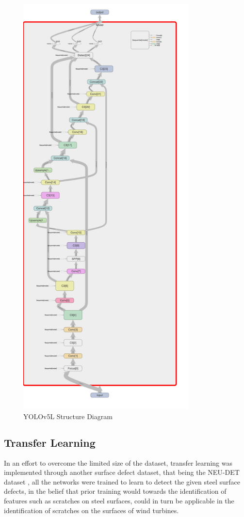 \documentclass[conference]{IEEEtran}
\begin{document}
\begin{figure}[H]
    \centering
    \includegraphics[width=9cm]{Images/YOLOV5L.png}
    \caption{YOLOv5L Structure Diagram}
    \label{fig:yol}
\end{figure}


\subsection{Transfer Learning}
In an effort to overcome the limited size of the dataset, transfer learning was implemented through another surface defect dataset, that being the NEU-DET dataset \cite{he_song_meng_yan_2019}, all the networks were trained to learn to detect the given steel surface defects, in the belief that prior training would towards the identification of features such as scratches on steel surfaces, could in turn be applicable in the identification of scratches on the surfaces of wind turbines.
\end{document}
